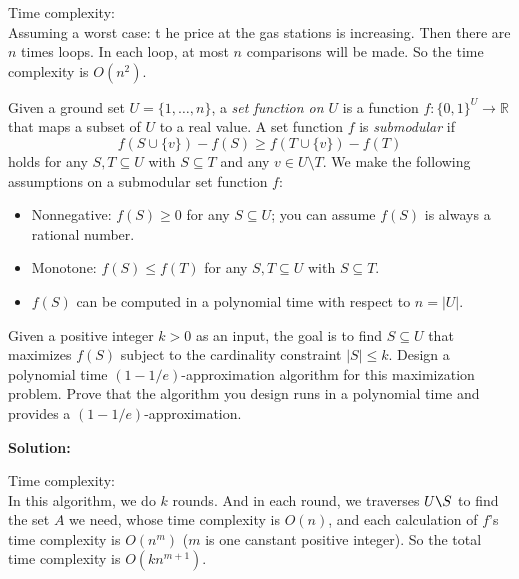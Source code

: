 \documentclass{oxmathproblems}
\begin{document}
\begin{questions}
    Time complexity:\\
    Assuming a worst case: t he price at the gas stations is increasing. Then there are $n$ times loops. In each loop, at most $n$ comparisons will be made. So the time complexity is $O(n^2)$.

\miquestion[25]
  Given a ground set $U=\{1,\ldots,n\}$, a \emph{set function on $U$} is a function $f:\{0,1\}^U\to\mathbb{R}$ that maps a subset of $U$ to a real value.
  A set function $f$ is \emph{submodular} if
  $$f(S\cup\{v\})-f(S)\geq f(T\cup\{v\})-f(T)$$
  holds for any $S,T\subseteq U$ with $S\subseteq T$ and any $v\in U\setminus T$.
  We make the following assumptions on a submodular set function $f$:
  \begin{itemize}
    \item Nonnegative: $f(S)\geq0$ for any $S\subseteq U$; you can assume $f(S)$ is always a rational number.
    \item Monotone: $f(S)\leq f(T)$ for any $S,T\subseteq U$ with $S\subseteq T$.
    \item $f(S)$ can be computed in a polynomial time with respect to $n=|U|$.
  \end{itemize}
  Given a positive integer $k>0$ as an input, the goal is to find $S\subseteq U$ that maximizes $f(S)$ subject to the cardinality constraint $|S|\leq k$.
  Design a polynomial time $(1-1/e)$-approximation algorithm for this maximization problem.
  Prove that the algorithm you design runs in a polynomial time and provides a $(1-1/e)$-approximation.
  
  \textbf{Solution:}

  \begin{breakablealgorithm}
  \caption{$max\_f(k, U)$}
  \begin{algorithmic}[1]
    \ENDFOR
  \end{algorithmic}
  \end{breakablealgorithm}

  Time complexity:\\
  In this algorithm, we do $k$ rounds. And in each round, we traverses $U \verb|\| S$ to find the set $A$ we need, whose time complexity is $O(n)$, and each calculation of $f$'s time complexity is $O(n^m)$ ($m$ is one canstant positive integer).
  So the total time complexity is $O(kn^{m+1})$.


\end{questions}
\end{document}
